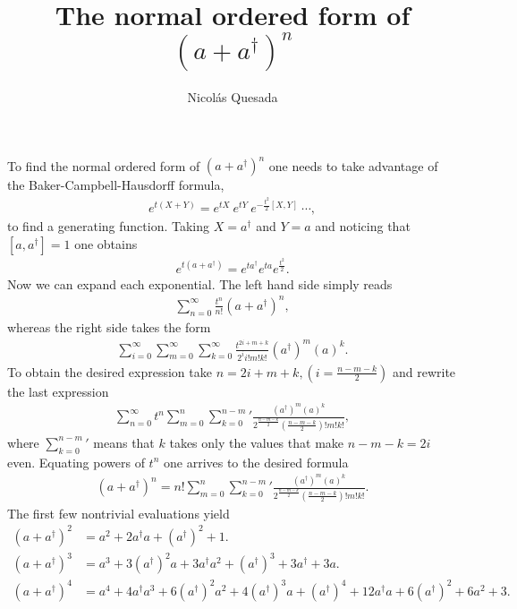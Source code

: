 \documentclass[english,12pt]{shreyasnotes}
\date{}
\title{The normal ordered form of $(a+a^{\dagger})^n$}
\author{Nicol\'as Quesada}
\begin{document}
\maketitle
\thispagestyle{empty}

To find the normal ordered form of $(a+a^{\dagger})^n$ one needs to take advantage 
of the  Baker-Campbell-Hausdorff formula,
\begin{align}
e^{t(X+Y)}= e^{tX}~  e^{tY} ~e^{-\frac{t^2}{2} [X,Y]} ~ \cdots,
\end{align}
to find a generating function. Taking $X=a^{\dagger}$ and $Y=a$ and noticing that $[a,a^{\dagger}]=1$ one obtains
\begin{align}
e^{t(a+a^{\dagger})}=e^{ t a^{\dagger}} e^{t a} e^{\frac{t^2}{2}}.
\end{align}
Now we can expand each exponential. The left hand side simply reads
\begin{align}
\sum_{n=0}^{\infty}\frac{t^n}{n!}\left(a+a^{\dagger} \right)^n,
\end{align}
whereas the right side takes the form
\begin{align}
 \sum_{i=0}^{\infty} \sum_{m=0}^{\infty}  \sum_{k=0}^{\infty} \frac{t^{2i+m+k}}{2^i i! m! k!} (a^{\dagger})^m (a)^k.
\end{align}
To obtain the desired expression take $n=2i+m+k, (i=\frac{n-m-k}{2})$ and rewrite the last expression
\begin{align}
\sum_{n=0}^{\infty} t^n \sum_{m=0}^n  {\sum_{k=0}^{n-m}}{'} \frac{(a^{\dagger})^m (a)^k}{2^{\frac{n-m-k}{2}}\left(\frac{n-m-k}{2}\right)! m! k! },
\end{align}
where ${\sum_{k=0}^{n-m}}{'}$ means that $k$ takes only the values that make $n-m-k=2 i$ even. Equating
powers of $t^n$ one arrives to the desired formula
\begin{align}
\left(a+a^{\dagger} \right)^n = n! \sum_{m=0}^n  {\sum_{k=0}^{n-m}}{'} \frac{(a^{\dagger})^m (a)^k}{2^{\frac{n-m-k}{2}}\left(\frac{n-m-k}{2}\right)! m! k! }.
\end{align}
The first few nontrivial evaluations yield
\begin{subequations}
\begin{align}
\left(a+a^{\dagger} \right)^2 &=  a^2 +2 a^{\dagger}a+\left(a^{\dagger }\right)^2+1. \\
\left(a+a^{\dagger} \right)^3 &= a^3+3 \left(a^{\dagger
   }\right)^2 a +3 a^{\dagger}a^2+\left(a^{\dagger }\right)^3+3 a^{\dagger } +3 a .\\
\left(a+a^{\dagger} \right)^4 &= a^4+4 a^{\dagger }a^3+6 \left(a^{\dagger }\right)^2 a^2+4\left(a^{\dagger }\right)^3 a+\left(a^{\dagger }\right)^4+12 a^{\dagger}a+6\left(a^{\dagger }\right)^2+6 a^2+3.
\end{align}
\end{subequations}
\end{document}
